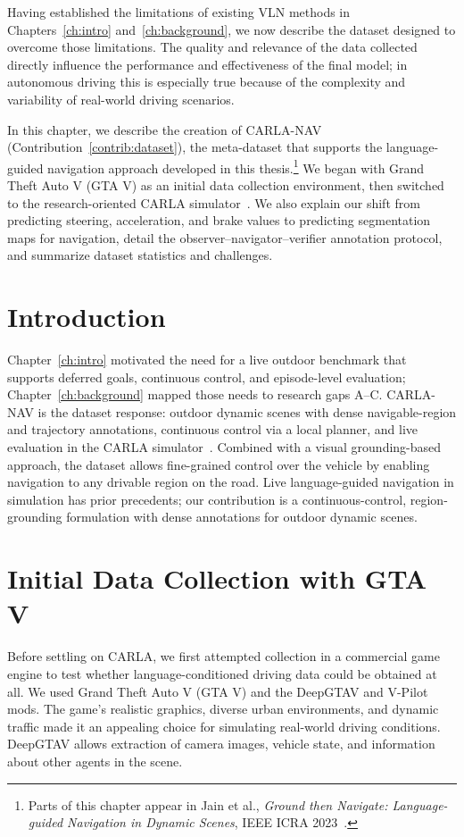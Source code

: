 Having established the limitations of existing VLN methods in Chapters~\ref{ch:intro} and~\ref{ch:background}, we now describe the dataset designed to overcome those limitations. The quality and relevance of the data collected directly influence the performance and effectiveness of the final model; in autonomous driving this is especially true because of the complexity and variability of real-world driving scenarios.

In this chapter, we describe the creation of CARLA-NAV (Contribution~\ref{contrib:dataset}), the meta-dataset that supports the language-guided navigation approach developed in this thesis.\footnote{Parts of this chapter appear in Jain et al., \textit{Ground then Navigate: Language-guided Navigation in Dynamic Scenes}, IEEE ICRA 2023~\cite{jain2023ground}.} We began with Grand Theft Auto V (GTA V) as an initial data collection environment, then switched to the research-oriented CARLA simulator~\cite{dosovitskiy2017carla}. We also explain our shift from predicting steering, acceleration, and brake values to predicting segmentation maps for navigation, detail the observer--navigator--verifier annotation protocol, and summarize dataset statistics and challenges.

\section{Introduction}

Chapter~\ref{ch:intro} motivated the need for a live outdoor benchmark that supports deferred goals, continuous control, and episode-level evaluation; Chapter~\ref{ch:background} mapped those needs to research gaps A--C. CARLA-NAV is the dataset response: outdoor dynamic scenes with dense navigable-region and trajectory annotations, continuous control via a local planner, and live evaluation in the CARLA simulator~\cite{dosovitskiy2017carla}. Combined with a visual grounding-based approach, the dataset allows fine-grained control over the vehicle by enabling navigation to any drivable region on the road. Live language-guided navigation in simulation has prior precedents; our contribution is a continuous-control, region-grounding formulation with dense annotations for outdoor dynamic scenes.

\section{Initial Data Collection with GTA V}

Before settling on CARLA, we first attempted collection in a commercial game engine to test whether language-conditioned driving data could be obtained at all. We used Grand Theft Auto V (GTA V) and the DeepGTAV and V-Pilot mods. The game's realistic graphics, diverse urban environments, and dynamic traffic made it an appealing choice for simulating real-world driving conditions. DeepGTAV allows extraction of camera images, vehicle state, and information about other agents in the scene.

